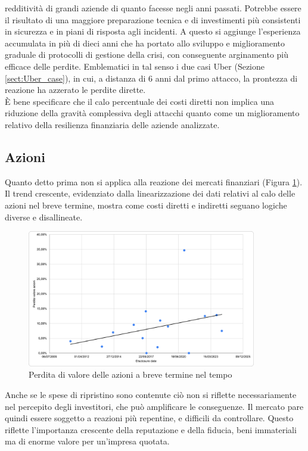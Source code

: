 \documentclass[12pt,a4paper,twoside]{report}
\begin{document}
redditivit\`a di grandi aziende di quanto facesse negli anni passati. 
Potrebbe essere il risultato di una maggiore preparazione tecnica e di investimenti pi\`u 
consistenti in sicurezza e in piani di risposta agli incidenti. A questo si aggiunge l'esperienza accumulata
in pi\`u di dieci anni che ha portato allo sviluppo e miglioramento graduale di protocolli di gestione della
crisi, con conseguente arginamento pi\`u efficace delle perdite. Emblematici in tal senso i due casi Uber (Sezione \ref{sect:Uber_case}), 
in cui, a distanza di 6 anni dal primo attacco, la prontezza di reazione ha azzerato le perdite dirette.\\
\`E bene specificare che il calo percentuale dei costi diretti non implica una riduzione della gravit\`a complessiva degli attacchi
quanto come un miglioramento relativo della resilienza finanziaria delle aziende analizzate.\\

\subsection{Azioni}
Quanto detto prima non si applica alla reazione dei mercati finanziari (Figura \ref{fig:stockloss}).
Il trend crescente, evidenziato dalla linearizzazione dei dati relativi al calo delle azioni nel breve termine,
mostra come costi diretti e indiretti seguano logiche diverse e disallineate. \\
\begin{figure}[H]
    \centering
    \includegraphics[width=10cm]{figures/stocks-date.png}
    \caption[Grafico linearizzato azioni]{Perdita di valore delle azioni a breve termine nel tempo}
    \label{fig:stockloss}
\end{figure}
Anche se le spese di ripristino 
sono contenute ci\`o non si riflette necessariamente nel percepito degli investitori, che pu\`o amplificare le conseguenze.
Il mercato pare quindi essere soggetto a reazioni pi\`u repentine, e difficili da controllare. Questo riflette l'importanza 
crescente della reputazione e della fiducia, beni immateriali ma di enorme  valore per un'impresa quotata.
\end{document}
